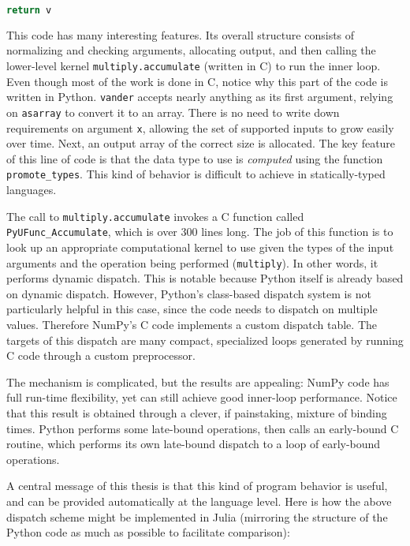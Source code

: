 {\begin{singlespace}
\begin{lstlisting}[language=python,style=ttcode]
  return v
\end{lstlisting}
\end{singlespace}

This code has many interesting features.
Its overall structure consists of normalizing and checking arguments,
allocating output, and then calling the lower-level kernel \texttt{multiply.accumulate}
(written in C) to run the inner loop.
Even though most of the work is done in C, notice why this part of the
code is written in Python.
\texttt{vander} accepts nearly anything as its first argument, relying on
\texttt{asarray} to convert it to an array.
There is no need to write down requirements on argument \texttt{x}, allowing
the set of supported inputs to grow easily over time.
Next, an output array of the correct size is allocated.
The key feature of this line of code is that the data type to use is
\emph{computed} using the function \texttt{promote\_types}.
This kind of behavior is difficult to achieve in statically-typed languages.

The call to \texttt{multiply.accumulate} invokes a C function called
\texttt{PyUFunc\_Accumulate}, which is over 300 lines long.
The job of this function is to look up an appropriate computational
kernel to use given the types of the input arguments and the operation
being performed (\texttt{multiply}).
In other words, it performs dynamic dispatch.
This is notable because Python itself is already based on dynamic dispatch.
However, Python's class-based dispatch system is not particularly helpful
in this case, since the code needs to dispatch on multiple values.
Therefore NumPy's C code implements a custom dispatch table.
The targets of this dispatch are many compact, specialized
loops generated by running C code through a custom preprocessor.

The mechanism is complicated, but the results are appealing:
NumPy code has full run-time flexibility, yet can still achieve
good inner-loop performance.
Notice that this result is obtained through a clever, if painstaking,
mixture of binding times.
Python performs some late-bound operations, then calls an early-bound
C routine, which performs its own late-bound dispatch to a loop of
early-bound operations.

A central message of this thesis is that this kind of program behavior
is useful, and can be provided automatically at the language level.
Here is how the above dispatch scheme might be implemented in Julia
(mirroring the structure of the Python code as much as possible to
facilitate comparison):

}
